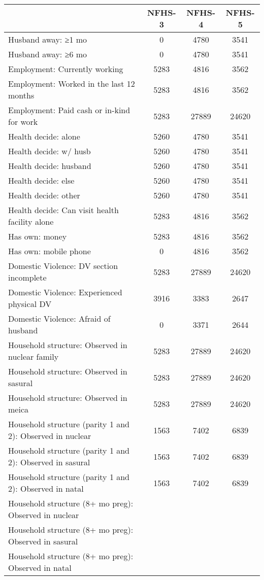 \begin{tabular}{l*{3}{c}}
\toprule
            &\multicolumn{1}{c}{NFHS-3}&\multicolumn{1}{c}{NFHS-4}&\multicolumn{1}{c}{NFHS-5}\\
\midrule
\midrule
Husband away: ≥1 mo&           0&        4780&        3541\\
Husband away: ≥6 mo&           0&        4780&        3541\\
Employment: Currently working&        5283&        4816&        3562\\
Employment: Worked in the last 12 months&        5283&        4816&        3562\\
Employment: Paid cash or in-kind for work&        5283&       27889&       24620\\
Health decide: alone&        5260&        4780&        3541\\
Health decide: w/ husb&        5260&        4780&        3541\\
Health decide: husband&        5260&        4780&        3541\\
Health decide: else&        5260&        4780&        3541\\
Health decide: other&        5260&        4780&        3541\\
Health decide: Can visit health facility alone&        5283&        4816&        3562\\
Has own: money&        5283&        4816&        3562\\
Has own: mobile phone&           0&        4816&        3562\\
Domestic Violence: DV section incomplete&        5283&       27889&       24620\\
Domestic Violence: Experienced physical DV&        3916&        3383&        2647\\
Domestic Violence: Afraid of husband&           0&        3371&        2644\\
Household structure: Observed in nuclear family&        5283&       27889&       24620\\
Household structure: Observed in sasural&        5283&       27889&       24620\\
Household structure: Observed in meica&        5283&       27889&       24620\\
Household structure (parity 1 and 2): Observed in nuclear&        1563&        7402&        6839\\
Household structure (parity 1 and 2): Observed in sasural&        1563&        7402&        6839\\
Household structure (parity 1 and 2): Observed in natal&        1563&        7402&        6839\\
Household structure (8+ mo preg): Observed in nuclear&            &            &            \\
Household structure (8+ mo preg): Observed in sasural&            &            &            \\
Household structure (8+ mo preg): Observed in natal&            &            &            \\
\bottomrule
\end{tabular}
